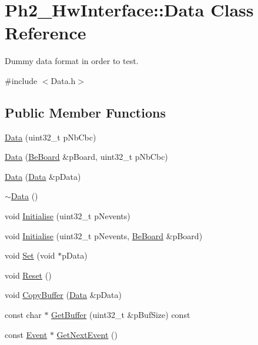\hypertarget{class_ph2___hw_interface_1_1_data}{\section{Ph2\-\_\-\-Hw\-Interface\-:\-:Data Class Reference}
\label{class_ph2___hw_interface_1_1_data}
}


Dummy data format in order to test.  




{\ttfamily \#include $<$Data.\-h$>$}

\subsection*{Public Member Functions}
\begin{DoxyCompactItemize}
\item 
\hyperlink{class_ph2___hw_interface_1_1_data_a4cbcbfc2a023f0e826253fc7308ebb17}{Data} (uint32\-\_\-t p\-Nb\-Cbc)
\item 
\hyperlink{class_ph2___hw_interface_1_1_data_a6b19ec929731107ee1bf288493b2ee7a}{Data} (\hyperlink{class_ph2___hw_description_1_1_be_board}{Be\-Board} \&p\-Board, uint32\-\_\-t p\-Nb\-Cbc)
\item 
\hyperlink{class_ph2___hw_interface_1_1_data_aefcb0c450523abe1c4397189f64a3aff}{Data} (\hyperlink{class_ph2___hw_interface_1_1_data}{Data} \&p\-Data)
\item 
\hyperlink{class_ph2___hw_interface_1_1_data_a889228098e5c0b4eb5d06ad7850cdd7e}{$\sim$\-Data} ()
\item 
void \hyperlink{class_ph2___hw_interface_1_1_data_ab3a85993abf1f3981ab917b5f87c4000}{Initialise} (uint32\-\_\-t p\-Nevents)
\item 
void \hyperlink{class_ph2___hw_interface_1_1_data_a4d6bcb42ecdaa4b5763a3b8279f22599}{Initialise} (uint32\-\_\-t p\-Nevents, \hyperlink{class_ph2___hw_description_1_1_be_board}{Be\-Board} \&p\-Board)
\item 
void \hyperlink{class_ph2___hw_interface_1_1_data_aec509baa349ed8a038797b63df76b3d9}{Set} (void $\ast$p\-Data)
\item 
void \hyperlink{class_ph2___hw_interface_1_1_data_ab33619d62d7662d11cf6c2bddebcc835}{Reset} ()
\item 
void \hyperlink{class_ph2___hw_interface_1_1_data_a751235bbc2393f58f9fd83b8837ad2b4}{Copy\-Buffer} (\hyperlink{class_ph2___hw_interface_1_1_data}{Data} \&p\-Data)
\item 
const char $\ast$ \hyperlink{class_ph2___hw_interface_1_1_data_a6093f26d20db6ca6a2a248b6bc8ddb25}{Get\-Buffer} (uint32\-\_\-t \&p\-Buf\-Size) const 
\item 
const \hyperlink{class_ph2___hw_interface_1_1_event}{Event} $\ast$ \hyperlink{class_ph2___hw_interface_1_1_data_a18d1e30edd97079893bbd2332809cba8}{Get\-Next\-Event} ()
\end{DoxyCompactItemize}
